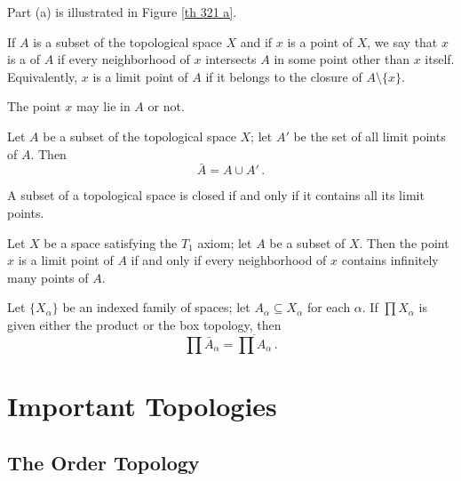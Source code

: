 Part (a) is illustrated in Figure \ref{th 321 a}.

\begin{definition}
	If $A$ is a subset of the topological space $X$ and if $x$ is 
	a point of $X$, we say that $x$ is a  of $A$ if every 
	neighborhood of $x$ intersects $A$ in some point other than 
	$x$ itself. Equivalently, $x$ is a limit point of $A$ if it 
	belongs to the closure of $A \setminus \{ x \}$.
\end{definition}

The point $x$ may lie in $A$ or not.

\begin{theorem}
	Let $A$ be a subset of the topological space $X$; let $A'$ be 
	the set of all limit points of $A$. Then
	\[
		\bar{A} = A \cup A'\,.
	\]
\end{theorem}
	
\begin{corollary}
	A subset of a topological space is closed if and only if 
	it contains all its limit points.
\end{corollary}

\begin{theorem}
	Let $X$ be a space satisfying the $T_1$ axiom; let $A$ be a 
	subset of $X$. Then the point $x$ is a limit point of $A$ if 
	and only if every neighborhood of $x$ contains infinitely 
	many points of $A$.
\end{theorem}

\begin{theorem}
	Let $\{ X_\alpha \}$ be an indexed family of spaces; let 
	$A_\alpha \subseteq X_\alpha$ for each $\alpha$. If $\prod 
	X_\alpha$ is given either the product or the box topology, then
	\[
		\prod \bar{A}_\alpha = \overline{\prod A_\alpha}\,.
	\]
\end{theorem}


\newpage

\section{Important Topologies}

\subsection{The Order Topology}

